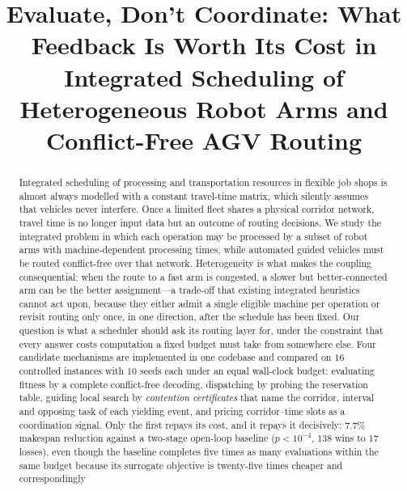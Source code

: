 \documentclass[manuscript,screen,review]{acmart}
\begin{document}
\title{Evaluate, Don't Coordinate: What Feedback Is Worth Its Cost in Integrated Scheduling of Heterogeneous Robot Arms and Conflict-Free AGV Routing}


\begin{abstract}
Integrated scheduling of processing and transportation resources in flexible job
shops is almost always modelled with a constant travel-time matrix, which
silently assumes that vehicles never interfere. Once a limited fleet shares a
physical corridor network, travel time is no longer input data but an outcome of
routing decisions. We study the integrated problem in which each operation may be
processed by a subset of robot arms with machine-dependent processing times,
while automated guided vehicles must be routed conflict-free over that network.
Heterogeneity is what makes the coupling consequential: when the route to a fast
arm is congested, a slower but better-connected arm can be the better
assignment---a trade-off that existing integrated heuristics cannot act upon,
because they either admit a single eligible machine per operation or revisit
routing only once, in one direction, after the schedule has been fixed. Our
question is what a scheduler should ask its routing layer for, under the
constraint that every answer costs computation a fixed budget must take from
somewhere else. Four
candidate mechanisms are implemented in one codebase and compared on $16$
controlled instances with $10$ seeds each under an equal wall-clock budget:
evaluating fitness by a complete conflict-free decoding, dispatching by probing
the reservation table, guiding local search by \emph{contention certificates}
that name the corridor, interval and opposing task of each yielding event, and
pricing corridor--time slots as a coordination signal. Only the first repays its
cost, and it repays it decisively: $7.7\%$ makespan reduction against a two-stage
open-loop baseline ($p<10^{-4}$, $138$ wins to $17$ losses), even though the
baseline completes five times as many evaluations within the same budget because
its surrogate objective is twenty-five times cheaper and correspondingly

\end{abstract}
\end{document}
